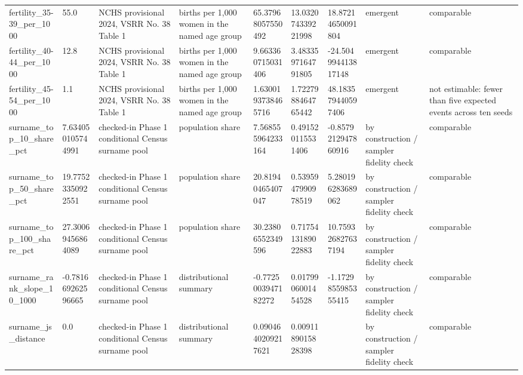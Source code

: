 \begin{longtable}{lllllllll}
fertility\_35-39\_per\_1000 & 55.0 & NCHS provisional 2024, VSRR No. 38 Table 1 & births per 1,000 women in the named age group & 65.37968057550492 & 13.032074339221998 & 18.87214650091804 & emergent & comparable \\
fertility\_40-44\_per\_1000 & 12.8 & NCHS provisional 2024, VSRR No. 38 Table 1 & births per 1,000 women in the named age group & 9.663360715031406 & 3.4833597164791805 & -24.504994413817148 & emergent & comparable \\
fertility\_45-54\_per\_1000 & 1.1 & NCHS provisional 2024, VSRR No. 38 Table 1 & births per 1,000 women in the named age group & 1.6300193738465716 & 1.7227988464765442 & 48.183579440597406 & emergent & not estimable: fewer than five expected events across ten seeds \\
surname\_top\_10\_share\_pct & 7.634050105744991 & checked-in Phase 1 conditional Census surname pool & population share & 7.568555964233164 & 0.491520115531406 & -0.8579212947860916 & by construction / sampler fidelity check & comparable \\
surname\_top\_50\_share\_pct & 19.77523350922551 & checked-in Phase 1 conditional Census surname pool & population share & 20.81940465407047 & 0.5395947990978519 & 5.280196283689062 & by construction / sampler fidelity check & comparable \\
surname\_top\_100\_share\_pct & 27.30069456864089 & checked-in Phase 1 conditional Census surname pool & population share & 30.23806552349596 & 0.7175413189022883 & 10.759326827637194 & by construction / sampler fidelity check & comparable \\
surname\_rank\_slope\_10\_1000 & -0.781669262596665 & checked-in Phase 1 conditional Census surname pool & distributional summary & -0.7725003947182272 & 0.0179906001454528 & -1.1729855985355415 & by construction / sampler fidelity check & comparable \\
surname\_js\_distance & 0.0 & checked-in Phase 1 conditional Census surname pool & distributional summary & 0.0904640209217621 & 0.0091189015828398 &  & by construction / sampler fidelity check & comparable \\
\bottomrule
\end{longtable}
